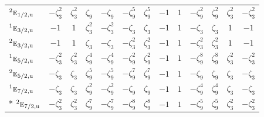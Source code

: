 \documentclass[10pt,a4paper]{article}
\numberwithin{equation}{section}
\newcommand{\irr}[1]{\text{\normalfont\scshape #1}}
\newcommand{\conjpair}[1]{{}^{#1}}
\newcommand{\ptag}[1]{\mathrm{#1}}
\newcommand{\rootunity}[1]{\zeta_{#1}}
\begin{document}
{\begin{longtable}{@{}lcccccccccccc@{}}
$\conjpair{2}\irr{e}_{1/2,\ptag{u}}$ & $-\rootunity{3}^{2}$ & $\rootunity{3}^{2}$ & $\rootunity{9}$ & $-\rootunity{9}$ & $-\rootunity{9}^{5}$ & $\rootunity{9}^{5}$ & $-1$ & $1$ & $-\rootunity{9}^{2}$ & $\rootunity{9}^{2}$ & $\rootunity{3}^{2}$ & $-\rootunity{3}^{2}$\\
$\conjpair{1}\irr{e}_{3/2,\ptag{u}}$ & $-1$ & $1$ & $\rootunity{3}^{2}$ & $-\rootunity{3}^{2}$ & $-\rootunity{3}$ & $\rootunity{3}$ & $-1$ & $1$ & $-\rootunity{3}$ & $\rootunity{3}$ & $1$ & $-1$\\
$\conjpair{2}\irr{e}_{3/2,\ptag{u}}$ & $-1$ & $1$ & $\rootunity{3}$ & $-\rootunity{3}$ & $-\rootunity{3}^{2}$ & $\rootunity{3}^{2}$ & $-1$ & $1$ & $-\rootunity{3}^{2}$ & $\rootunity{3}^{2}$ & $1$ & $-1$\\
$\conjpair{1}\irr{e}_{5/2,\ptag{u}}$ & $-\rootunity{3}^{2}$ & $\rootunity{3}^{2}$ & $\rootunity{9}^{4}$ & $-\rootunity{9}^{4}$ & $-\rootunity{9}^{2}$ & $\rootunity{9}^{2}$ & $-1$ & $1$ & $-\rootunity{9}^{8}$ & $\rootunity{9}^{8}$ & $\rootunity{3}^{2}$ & $-\rootunity{3}^{2}$\\
$\conjpair{2}\irr{e}_{5/2,\ptag{u}}$ & $-\rootunity{3}$ & $\rootunity{3}$ & $\rootunity{9}^{5}$ & $-\rootunity{9}^{5}$ & $-\rootunity{9}^{7}$ & $\rootunity{9}^{7}$ & $-1$ & $1$ & $-\rootunity{9}$ & $\rootunity{9}$ & $\rootunity{3}$ & $-\rootunity{3}$\\
$\conjpair{1}\irr{e}_{7/2,\ptag{u}}$ & $-\rootunity{3}$ & $\rootunity{3}$ & $\rootunity{9}^{2}$ & $-\rootunity{9}^{2}$ & $-\rootunity{9}$ & $\rootunity{9}$ & $-1$ & $1$ & $-\rootunity{9}^{4}$ & $\rootunity{9}^{4}$ & $\rootunity{3}$ & $-\rootunity{3}$\\*
$\conjpair{2}\irr{e}_{7/2,\ptag{u}}$ & $-\rootunity{3}^{2}$ & $\rootunity{3}^{2}$ & $\rootunity{9}^{7}$ & $-\rootunity{9}^{7}$ & $-\rootunity{9}^{8}$ & $\rootunity{9}^{8}$ & $-1$ & $1$ & $-\rootunity{9}^{5}$ & $\rootunity{9}^{5}$ & $\rootunity{3}^{2}$ & $-\rootunity{3}^{2}$\\
\bottomrule\end{longtable}}
\end{document}
